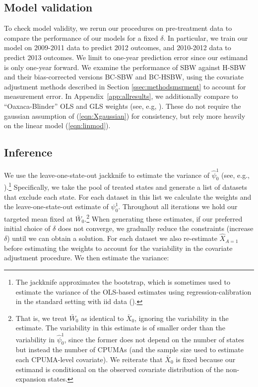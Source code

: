 \documentclass[aoas]{imsart}
\theoremstyle{plain}
\theoremstyle{remark}
\begin{document}
\subsection{Model validation}

To check model validity, we rerun our procedures on pre-treatment data to compare the performance of our models for a fixed $\delta$. In particular, we train our model on 2009-2011 data to predict 2012 outcomes, and 2010-2012 data to predict 2013 outcomes. We limit to one-year prediction error since our estimand is only one-year forward. We examine the performance of SBW against H-SBW and their bias-corrected versions BC-SBW and BC-HSBW, using the covariate adjustment methods described in Section \ref{ssec:methodsmsrment} to account for measurement error. In Appendix~\ref{app:allresults}, we additionally compare to ``Oaxaca-Blinder'' OLS and GLS weights (see, e.g, \cite{kline2011oaxaca}). These do not require the gaussian assumption of (\ref{eqn:Xgaussian}) for consistency, but rely more heavily on the linear model (\ref{eqn:linmod}).

\subsection{Inference}

We use the leave-one-state-out jackknife to estimate the variance of $\hat{\psi}_0^1$ (see, e.g., \cite{cameron2015practitioner}).\footnote{The jackknife approximates the bootstrap, which is sometimes used to estimate the variance of the OLS-based estimates using regression-calibration in the standard setting with iid data (\cite{carroll2006measurement}).} Specifically, we take the pool of treated states and generate a list of datasets that exclude each state. For each dataset in this list we calculate the weights and the leave-one-state-out estimate of $\psi_0^1$. Throughout all iterations we hold our targeted mean fixed at $\bar{W}_0$.\footnote{That is, we treat $\bar{W}_0$ as identical to $\bar{X}_0$, ignoring the variability in the estimate. The variability in this estimate is of smaller order than the variability in $\hat{\psi}_0^1$, since the former does not depend on the number of states but instead the number of CPUMAs (and the sample size used to estimate each CPUMA-level covariate). We reiterate that $\bar{X}_0$ is fixed because our estimand is conditional on the observed covariate distribution of the non-expansion states.} When generating these estimates, if our preferred initial choice of $\delta$ does not converge, we gradually reduce the constraints (increase $\delta$) until we can obtain a solution. For each dataset we also re-estimate $\hat{X}_{A=1}$ before estimating the weights to account for the variability in the covariate adjustment procedure. We then estimate the variance:
\end{document}
